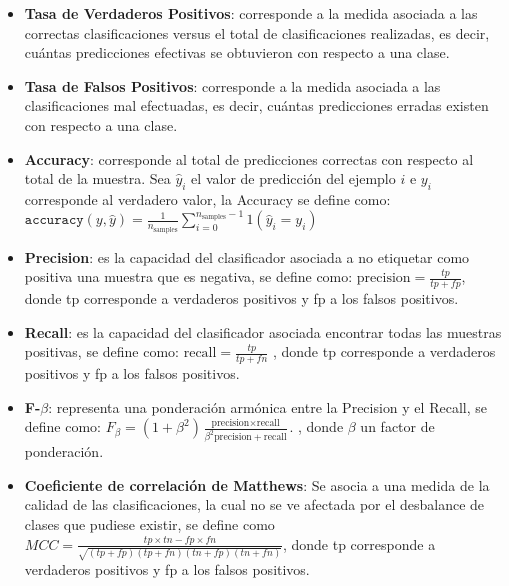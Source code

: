 \begin{itemize}
	
	\item \textbf{Tasa de Verdaderos Positivos}: corresponde a la medida asociada a las correctas clasificaciones versus el total de clasificaciones realizadas, es decir, cuántas predicciones efectivas se obtuvieron con respecto a una clase.
	
	\item \textbf{Tasa de Falsos Positivos}: corresponde a la medida asociada a las clasificaciones mal efectuadas, es decir, cuántas predicciones erradas existen con respecto a una clase.
	
	
	\item \textbf{Accuracy}: corresponde al total de predicciones correctas con respecto al total de la muestra. Sea $\hat{y}_i$ el valor de predicción del ejemplo $i$ e $y_{i}$ corresponde al verdadero valor, la Accuracy se define como: $\texttt{accuracy}(y, \hat{y}) = \frac{1}{n_\text{samples}} \sum_{i=0}^{n_\text{samples}-1} 1(\hat{y}_i = y_i)$
	
	\item \textbf{Precision}: es la capacidad del clasificador asociada a no etiquetar como positiva una muestra que es negativa, se define como: $\text{precision} = \frac{tp}{tp + fp}$, donde tp corresponde a verdaderos positivos y fp a los falsos positivos.
	
	
	\item \textbf{Recall}: es la capacidad del clasificador asociada encontrar todas las muestras positivas, se define como: $\text{recall} = \frac{tp}{tp + fn}$ , donde tp corresponde a verdaderos positivos y fp a los falsos positivos.
	
	\item \textbf{F-$\beta$}: representa una ponderación armónica entre la Precision y el Recall, se define como: $F_\beta = (1 + \beta^2) \frac{\text{precision} \times \text{recall}}{\beta^2 \text{precision} + \text{recall}}.$ , donde $\beta$ un factor de ponderación.
	
	\item \textbf{Coeficiente de correlación de Matthews}: Se asocia a una medida de la calidad de las clasificaciones, la cual no se ve afectada por el desbalance de clases que pudiese existir, se define como $MCC = \frac{tp \times tn - fp \times fn}{\sqrt{(tp + fp)(tp + fn)(tn + fp)(tn + fn)}}$, donde tp corresponde a verdaderos positivos y fp a los falsos positivos.
	
\end{itemize}
	
